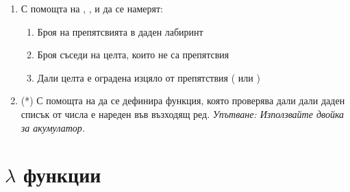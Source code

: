 \begin{enumerate}[resume]
	\item С помощта на , ,  и  да се намерят:
	\begin{enumerate}[label=\alph*)]
		\item Броя на препятсвията в даден лабиринт
		\item Броя съседи на целта, които не са препятсвия
		\item Дали целта е оградена изцяло от препятствия ( или )
	\end{enumerate}

	\item(*) С помощта на  да се дефинира функция, която проверява дали дали даден списък от числа  е нареден във възходящ ред. \emph{Упътване: Използвайте двойка  за акумулатор.}

\end{enumerate}

\section {$\lambda$ функции}

